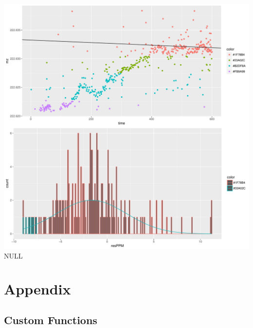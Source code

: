 \documentclass[]{article}
\begin{document}
\includegraphics{Supplementary_document_files/figure-latex/filter.lm.222-1.pdf}
NULL

\section{Appendix}\label{appendix}

\subsection{Custom Functions}\label{custom-functions}
\end{document}
